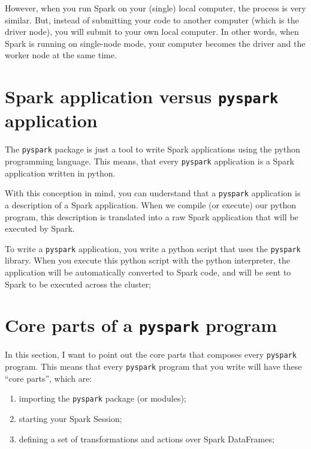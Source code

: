 \documentclass[
  11pt,
  letterpaper,
  DIV=11,
  numbers=noendperiod]{scrreprt}
\begin{document}
However, when you run Spark on your (single) local computer, the process
is very similar. But, instead of submitting your code to another
computer (which is the driver node), you will submit to your own local
computer. In other words, when Spark is running on single-node mode,
your computer becomes the driver and the worker node at the same time.

\hypertarget{spark-application-versus-pyspark-application}{%
\section{\texorpdfstring{Spark application versus \texttt{pyspark}
application}{Spark application versus pyspark application}}\label{spark-application-versus-pyspark-application}}

The \texttt{pyspark} package is just a tool to write Spark applications
using the python programming language. This means, that every
\texttt{pyspark} application is a Spark application written in python.

With this conception in mind, you can understand that a \texttt{pyspark}
application is a description of a Spark application. When we compile (or
execute) our python program, this description is translated into a raw
Spark application that will be executed by Spark.

To write a \texttt{pyspark} application, you write a python script that
uses the \texttt{pyspark} library. When you execute this python script
with the python interpreter, the application will be automatically
converted to Spark code, and will be sent to Spark to be executed across
the cluster;

\hypertarget{core-parts-of-a-pyspark-program}{%
\section{\texorpdfstring{Core parts of a \texttt{pyspark}
program}{Core parts of a pyspark program}}\label{core-parts-of-a-pyspark-program}}

In this section, I want to point out the core parts that composes every
\texttt{pyspark} program. This means that every \texttt{pyspark} program
that you write will have these ``core parts'', which are:

\begin{enumerate}
\def\labelenumi{\arabic{enumi})}
\item
  importing the \texttt{pyspark} package (or modules);
\item
  starting your Spark Session;
\item
  defining a set of transformations and actions over Spark DataFrames;
\end{enumerate}
\end{document}
